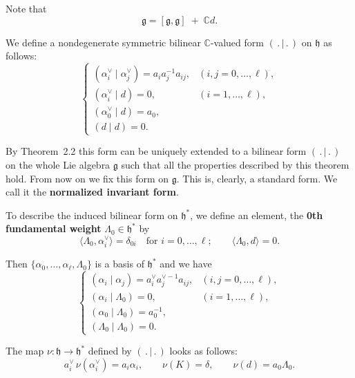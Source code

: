 \documentclass[12pt]{article}
\begin{document}
Note that
\[
    \mathfrak{g} = [\mathfrak{g},\mathfrak{g}] \;+\; \mathbb{C}d.
\]

We define a nondegenerate symmetric bilinear $\mathbb{C}$-valued form $(\,.\,|\,.\,)$ 
on $\mathfrak{h}$ as follows:
\begin{equation}
\label{eq:6.2.1}
\begin{cases}
(\alpha_i^\vee \mid \alpha_j^\vee) = a_i a_j^{-1} a_{ij}, & (i,j = 0,\dots,\ell), \\[6pt]
(\alpha_i^\vee \mid d) = 0, & (i=1,\dots,\ell), \\[6pt]
(\alpha_0^\vee \mid d) = a_0, \\[6pt]
(d \mid d) = 0.
\end{cases}
\end{equation}

By Theorem~2.2 this form can be uniquely extended to a bilinear form 
$(\,.\,|\,.\,)$ on the whole Lie algebra $\mathfrak{g}$ such that all the properties 
described by this theorem hold. From now on we fix this form on $\mathfrak{g}$. 
This is, clearly, a standard form. We call it the \textbf{normalized invariant form}.

To describe the induced bilinear form on $\mathfrak{h}^*$, we define an element, the \textbf{0th fundamental weight} $\Lambda_0 \in \mathfrak{h}^*$ by
\[
    \langle \Lambda_0, \alpha_i^\vee \rangle = \delta_{0i}
    \quad \text{for } i=0,\dots,\ell;
    \qquad
    \langle \Lambda_0, d \rangle = 0.
\]

Then $\{\alpha_0,\dots,\alpha_\ell,\Lambda_0\}$ is a basis of $\mathfrak{h}^*$ and we have
\begin{equation}
\label{eq:6.2.2}
\begin{cases}
(\alpha_i \mid \alpha_j) = a_i^\vee a_j^{\vee -1} a_{ij}, & (i,j=0,\dots,\ell), \\[6pt]
(\alpha_i \mid \Lambda_0) = 0, & (i=1,\dots,\ell), \\[6pt]
(\alpha_0 \mid \Lambda_0) = a_0^{-1}, \\[6pt]
(\Lambda_0 \mid \Lambda_0) = 0.
\end{cases}
\end{equation}

The map $\nu : \mathfrak{h} \to \mathfrak{h}^*$ defined by $(\,.\,|\,.\,)$ looks as follows:
\begin{equation}
\label{eq:6.2.3}
a_i^\vee \, \nu(\alpha_i^\vee) = a_i \alpha_i, 
\qquad 
\nu(K) = \delta,
\qquad 
\nu(d) = a_0 \Lambda_0.
\end{equation}
\end{document}
